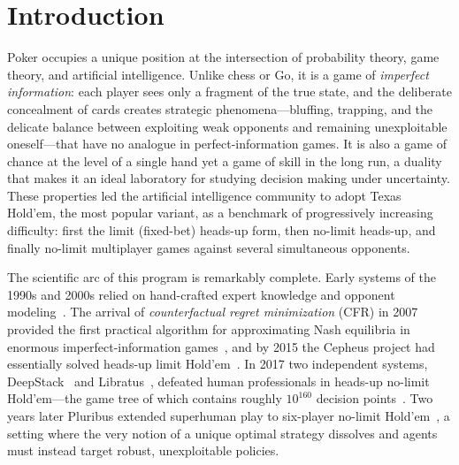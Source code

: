 \section{Introduction}\label{sec:intro}

Poker occupies a unique position at the intersection of probability theory, game theory, and artificial intelligence. Unlike chess or Go, it is a game of \emph{imperfect information}: each player sees only a fragment of the true state, and the deliberate concealment of cards creates strategic phenomena---bluffing, trapping, and the delicate balance between exploiting weak opponents and remaining unexploitable oneself---that have no analogue in perfect-information games. It is also a game of chance at the level of a single hand yet a game of skill in the long run, a duality that makes it an ideal laboratory for studying decision making under uncertainty. These properties led the artificial intelligence community to adopt Texas Hold'em, the most popular variant, as a benchmark of progressively increasing difficulty: first the limit (fixed-bet) heads-up form, then no-limit heads-up, and finally no-limit multiplayer games against several simultaneous opponents.

The scientific arc of this program is remarkably complete. Early systems of the 1990s and 2000s relied on hand-crafted expert knowledge and opponent modeling~\cite{billings2002challenge}. The arrival of \emph{counterfactual regret minimization} (CFR) in 2007 provided the first practical algorithm for approximating Nash equilibria in enormous imperfect-information games~\cite{zinkevich2007regret}, and by 2015 the Cepheus project had essentially solved heads-up limit Hold'em~\cite{bowling2015ceph}. In 2017 two independent systems, DeepStack~\cite{moravcik2017deepstack} and Libratus~\cite{brown2017libratus}, defeated human professionals in heads-up no-limit Hold'em---the game tree of which contains roughly $10^{160}$ decision points~\cite{sandholm2015abstraction}. Two years later Pluribus extended superhuman play to six-player no-limit Hold'em~\cite{brown2019pluribus}, a setting where the very notion of a unique optimal strategy dissolves and agents must instead target robust, unexploitable policies.

